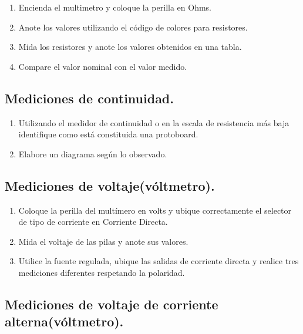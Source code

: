 \documentclass[10pt]{article}
\begin{document}
\begin{multicols}{2}
\begin{enumerate}
	\item Encienda el multimetro y coloque la perilla en Ohms.
	\item Anote los valores utilizando el código de colores para resistores.
	\item Mida los resistores y anote los valores obtenidos en una tabla.
	\item Compare el valor nominal con el valor medido.
\end{enumerate}

\subsection{Mediciones de continuidad.}

\begin{enumerate}
	\item Utilizando el medidor de continuidad o en la escala de resistencia más baja identifique como está constituida una protoboard.
	\item Elabore un diagrama según lo observado.
\end{enumerate}

\subsection{Mediciones de voltaje(vóltmetro).}

\begin{enumerate}
	\item Coloque la perilla del multímero en volts y ubique correctamente el selector de tipo de corriente en Corriente Directa.
	\item Mida el voltaje de las pilas y anote sus valores.
	\item Utilice la fuente regulada, ubique las salidas de corriente directa y realice tres mediciones diferentes respetando la polaridad.
\end{enumerate}

\subsection{Mediciones de voltaje de corriente alterna(vóltmetro).}


\end{multicols}
\end{document}
